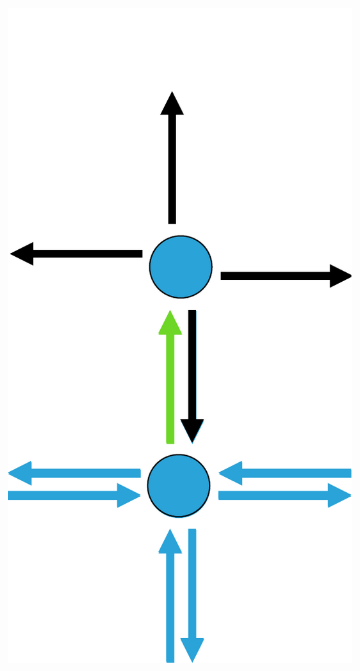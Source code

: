 \documentclass[12pt]{article}
\begin{document}
\begin{figure}[tb]
\begin{subfigure}[b]{0.15\textwidth}
      \includegraphics[width=\textwidth]{img/3}
      \caption{}\label{fig:contraction_kernel_greedy3}
  \end{subfigure}~%
  \begin{subfigure}[b]{0.15\textwidth}

\end{subfigure}
\end{figure}
\end{document}

